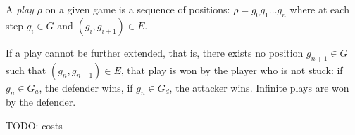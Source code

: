 \begin{definition}
    A \emph{play} $\rho$ on a given game is a sequence of positions:
    $\rho = g_0g_1 \ldots g_n$ where at each step
    $g_i \in G$ and $(g_i, g_{i+1}) \in E$.

    If a play cannot be further extended, that is, there exists no position
    $g_{n+1} \in G$ such that $(g_n, g_{n+1}) \in E$,
    that play is won by the player who is not stuck:
    if $g_n \in G_a$, the defender wins, if $g_n \in G_d$, the attacker wins.
    Infinite plays are won by the defender.

    \scriptsize{TODO: costs}
\end{definition}

